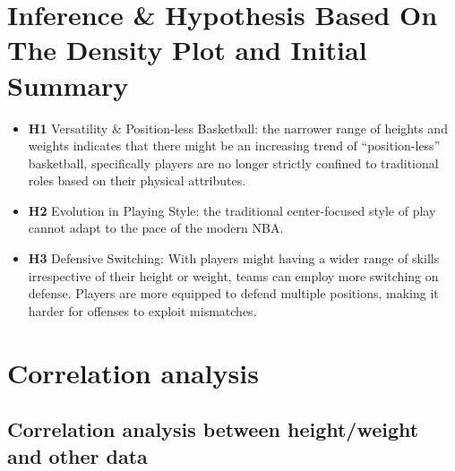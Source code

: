 \documentclass[
]{book}
\providecommand{\tightlist}{%
  \setlength{\itemsep}{0pt}\setlength{\parskip}{0pt}}
\theoremstyle{definition}
\theoremstyle{definition}
\theoremstyle{definition}
\theoremstyle{definition}
\theoremstyle{remark}
\begin{document}
\hypertarget{inference-hypothesis-based-on-the-density-plot-and-initial-summary}{%
\section{Inference \& Hypothesis Based On The Density Plot and Initial Summary}\label{inference-hypothesis-based-on-the-density-plot-and-initial-summary}}

\begin{itemize}
\tightlist
\item
  \textbf{H1} Versatility \& Position-less Basketball: the narrower range of heights and weights indicates that there might be an increasing trend of ``position-less'' basketball, specifically players are no longer strictly confined to traditional roles based on their physical attributes.
\item
  \textbf{H2} Evolution in Playing Style: the traditional center-focused style of play cannot adapt to the pace of the modern NBA.
\item
  \textbf{H3} Defensive Switching: With players might having a wider range of skills irrespective of their height or weight, teams can employ more switching on defense. Players are more equipped to defend multiple positions, making it harder for offenses to exploit mismatches.
\end{itemize}

\hypertarget{correlation-analysis}{%
\section{Correlation analysis}\label{correlation-analysis}}

\hypertarget{correlation-analysis-between-heightweight-and-other-data}{%
\subsection{Correlation analysis between height/weight and other data}\label{correlation-analysis-between-heightweight-and-other-data}}
\end{document}
